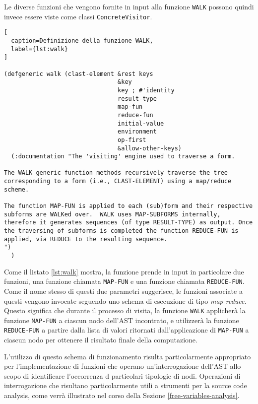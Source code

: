 Le diverse funzioni che vengono fornite in input alla funzione \texttt{WALK}
possono quindi invece essere viste come classi \texttt{ConcreteVisitor}.\\

\begin{lstlisting}[
  caption=Definizione della funzione WALK,
  label={lst:walk}
]

(defgeneric walk (clast-element &rest keys
                                &key
                                key ; #'identity
                                result-type
                                map-fun
                                reduce-fun
                                initial-value
                                environment
                                op-first
                                &allow-other-keys)
  (:documentation "The 'visiting' engine used to traverse a form.

The WALK generic function methods recursively traverse the tree
corresponding to a form (i.e., CLAST-ELEMENT) using a map/reduce
scheme.

The function MAP-FUN is applied to each (sub)form and their respective
subforms are WALKed over.  WALK uses MAP-SUBFORMS internally,
therefore it generates sequences (of type RESULT-TYPE) as output. Once
the traversing of subforms is completed the function REDUCE-FUN is
applied, via REDUCE to the resulting sequence.
")
  )

\end{lstlisting}

Come il listato \ref{lst:walk} mostra, la funzione prende in input in
particolare due funzioni, una funzione chiamata \texttt{MAP-FUN} e una funzione
chiamata \texttt{REDUCE-FUN}. Come il nome stesso di questi due parametri
suggerisce, le funzioni associate a questi vengono invocate seguendo uno schema
di esecuzione di tipo \textit{map-reduce}. Questo significa che durante il
processo di visita, la funzione \texttt{WALK} applicherà la funzione \texttt
{MAP-FUN} a ciascun nodo dell'AST incontrato, e utilizzerà la funzione \texttt
{REDUCE-FUN} a partire dalla lista di valori ritornati dall'applicazione di
\texttt{MAP-FUN} a ciascun nodo per ottenere il risultato finale della
computazione.

L'utilizzo di questo schema di funzionamento risulta particolarmente appropriato
per l'implementazione di funzioni che operano un'interrogazione dell'AST allo
scopo di identificare l'occorrenza d particolari tipologie di nodi. Operazioni
di interrogazione che risultano particolarmente utili a strumenti per la source
code analysis, come verrà illustrato nel corso della Sezione
\ref{free-variables-analysis}.\\

